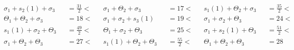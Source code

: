 \documentclass{article}
\begin{document}
\begin{itemize}
\[\begin{aligned}
                &\sigma_1 + s_2(1) + \sigma_3& &= \frac{31}{2}<& 
                &\sigma_1 + \Theta_2 + \sigma_3& &= 17<&
                &s_1(1) + \Theta_2 + \sigma_3& &= \frac{35}{2}<\\
                &\Theta_1 + \Theta_2 + \sigma_3& &= 18<&
                &\sigma_1 + \sigma_2 + s_3(1)& &= 19<&
                &\sigma_1 + \sigma_2 + \Theta_3& &= 24<\\
                &s_1(1) + \sigma_2 + \Theta_3& &= \frac{49}{2}<&
                &\Theta_1 + \sigma_2 + \Theta_3& &= 25<&
                &\sigma_1 + s_2(1) + \Theta_3& &= \frac{51}{2}<\\
                &\sigma_1 + \Theta_2 + \Theta_3& &= 27<&
                &s_1(1) + \Theta_2 + \Theta_3& &= \frac{55}{2}<&
                &\Theta_1 + \Theta_2 + \Theta_3& &= 28\\
            \end{aligned}
        \]

\end{itemize}
\end{document}
